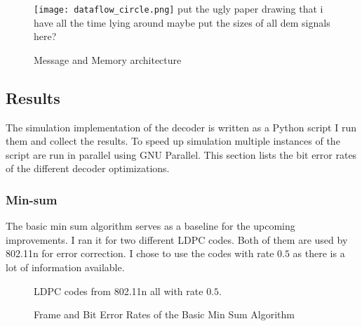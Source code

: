 \begin{figure}
    \texttt{[image: dataflow\_circle.png]}
    put the ugly paper drawing that i have all the time lying around maybe put the sizes of all dem signals here?
    \centering
    \caption{Message and Memory architecture}
\end{figure}


\subsection{Results}
The simulation implementation of the decoder is written as a Python script I run them and collect the results. To speed up simulation multiple instances of the script are run in parallel using GNU Parallel. This section lists the bit error rates of the different decoder optimizations.

\subsubsection{Min-sum}
The basic min sum algorithm serves as a baseline for the upcoming improvements. I ran it for two different LDPC codes. Both of them are used by 802.11n for error correction. I chose to use the codes with rate $0.5$ as there is a lot of information available.
\begin{figure}
    \centering

    LDPC codes from 802.11n all with rate $0.5$.
    \caption{Frame and Bit Error Rates of the Basic Min Sum Algorithm}
    \label{min_sum_base}
\end{figure}

